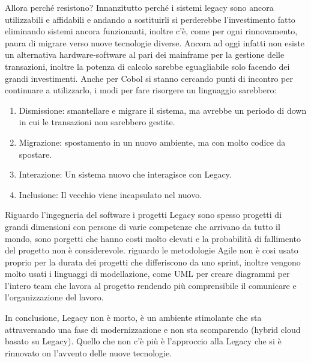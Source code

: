 \documentclass{article}
\begin{document}
Allora perché resistono?
Innanzitutto perché i sistemi legacy sono ancora utilizzabili e affidabili e andando a sostituirli si perderebbe l'investimento fatto eliminando sistemi ancora funzionanti, inoltre  c'è, come per ogni rinnovamento, paura di migrare verso nuove tecnologie diverse.
Ancora ad oggi infatti non esiste un alternativa hardware-software al pari dei mainframe  per la gestione delle transazioni, inoltre la potenza di calcolo sarebbe eguagliabile solo facendo dei grandi investimenti.
Anche per Cobol si stanno cercando punti di incontro per continuare a utilizzarlo, i modi per fare risorgere un linguaggio sarebbero:
\begin{enumerate}
    \item Dismissione: smantellare e migrare il sistema, ma avrebbe un periodo di down in cui le transazioni non sarebbero gestite.
    \item Migrazione: spostamento in un nuovo ambiente, ma con molto codice da spostare.
    \item Interazione: Un sistema nuovo che interagisce con Legacy.
    \item Inclusione: Il vecchio viene incapsulato nel nuovo.
\end{enumerate}
Riguardo l'ingegneria del software i progetti Legacy sono spesso progetti di grandi dimensioni con persone di varie competenze che arrivano da tutto il mondo, sono porgetti che hanno costi molto elevati e la probabilità di fallimento del progetto non è considerevole.
riguardo le metodologie Agile non è cosi usato proprio per la durata dei progetti che differiscono da uno sprint, inoltre vengono molto usati i linguaggi di modellazione, come UML per creare diagrammi per l'intero team che lavora al progetto rendendo più comprensibile il comunicare e l'organizzazione del lavoro.

In conclusione, Legacy non è morto, è un ambiente stimolante che sta attraversando una fase di modernizzazione e non sta scomparendo (hybrid cloud basato su Legacy). Quello che non c'è più è l'approccio alla Legacy che si è rinnovato on l'avvento delle nuove tecnologie.
\end{document}
